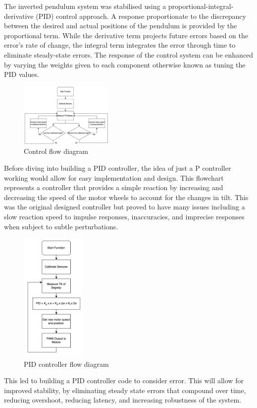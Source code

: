 \vspace{2mm}

The inverted pendulum system was stabilised using a proportional-integral-derivative (PID) control approach. A response proportionate to the discrepancy between the desired and actual positions of the pendulum is provided by the proportional term. While the derivative term projects future errors based on the error's rate of change, the integral term integrates the error through time to eliminate steady-state errors. The response of the control system can be enhanced by varying the weights given to each component otherwise known as tuning the PID values.

\begin{figure}
    \centerline{\includegraphics[width=0.4\textwidth]{images/control-flow.png}}
    \caption{Control flow diagram}
\end{figure}
Before diving into building a PID controller, the idea of just a P controller working would allow for easy implementation and design. This flowchart represents a controller that provides a simple reaction by increasing and decreasing the speed of the motor wheels to account for the changes in tilt. This was the original designed controller but proved to have many issues including a slow reaction speed to impulse responses, inaccuracies, and imprecise responses when subject to subtle perturbations.  

\begin{figure}
    \centerline{\includegraphics[width=0.28\textwidth]{images/pid-flow.png}}
    \caption{PID controller flow diagram}
\end{figure}
This led to building a PID controller code to consider error. This will allow for improved stability, by eliminating steady state errors that compound over time, reducing overshoot, reducing latency, and increasing robustness of the system.

